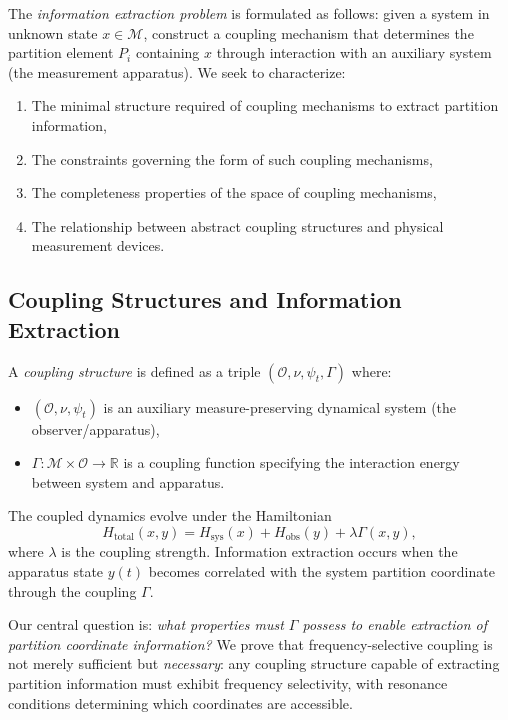 \documentclass[twocolumn,10pt,a4paper]{article}
\theoremstyle{remark}
\newcommand{\manifold}{\mathcal{M}}
\newcommand{\oscillator}{\mathcal{O}}
\begin{document}
The \emph{information extraction problem} is formulated as follows: given a system in unknown state $x \in \manifold$, construct a coupling mechanism that determines the partition element $P_i$ containing $x$ through interaction with an auxiliary system (the measurement apparatus). We seek to characterize:
\begin{enumerate}[label=(\alph*)]
    \item The minimal structure required of coupling mechanisms to extract partition information,
    \item The constraints governing the form of such coupling mechanisms,
    \item The completeness properties of the space of coupling mechanisms,
    \item The relationship between abstract coupling structures and physical measurement devices.
\end{enumerate}

\subsection{Coupling Structures and Information Extraction}

A \emph{coupling structure} is defined as a triple $(\oscillator, \nu, \psi_t, \Gamma)$ where:
\begin{itemize}
    \item $(\oscillator, \nu, \psi_t)$ is an auxiliary measure-preserving dynamical system (the observer/apparatus),
    \item $\Gamma: \manifold \times \oscillator \to \mathbb{R}$ is a coupling function specifying the interaction energy between system and apparatus.
\end{itemize}

The coupled dynamics evolve under the Hamiltonian
\begin{equation}
H_{\text{total}}(x, y) = H_{\text{sys}}(x) + H_{\text{obs}}(y) + \lambda \Gamma(x, y),
\end{equation}
where $\lambda$ is the coupling strength. Information extraction occurs when the apparatus state $y(t)$ becomes correlated with the system partition coordinate through the coupling $\Gamma$.

Our central question is: \emph{what properties must $\Gamma$ possess to enable extraction of partition coordinate information?} We prove that frequency-selective coupling is not merely sufficient but \emph{necessary}: any coupling structure capable of extracting partition information must exhibit frequency selectivity, with resonance conditions determining which coordinates are accessible.
\end{document}
